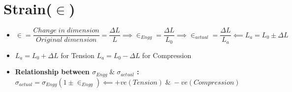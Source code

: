 \documentclass[8pt]{report}
\begin{document}
\section{Strain($\in$)}
	\begin{itemize}
		\item $\boxed{\in=\dfrac{Change\;in\;dimension}{Original\;dimension}=\dfrac{\Delta L}{L}}\implies \boxed{\in_{Engg}=\dfrac{\Delta L}{L_0}} \implies \boxed{\in_{actual}=\dfrac{\Delta L}{L_a}} \impliedby \boxed{L_{a}=L_0\pm\Delta L}$
		\item $L_a=L_0+\Delta L$ for Tension \hspace{1cm}$L_a=L_0-\Delta L$ for Compression
		\item \textbf{Relationship between $\sigma_{Engg}\;\&\;\sigma_{actual}$ : }$\boxed{\sigma_{actual}=\sigma_{Engg}(1\pm\in_{Engg})}\impliedby +ve(Tension)\;\&\;-ve(Compression)$
	\end{itemize}\hrulefill
\end{document}
